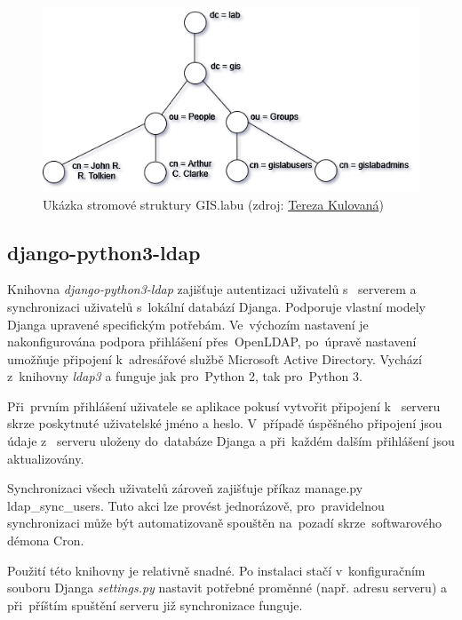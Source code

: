 \begin{figure}[H] \centering
      \includegraphics[width=400pt]{./pictures/gislab-ldap_dit.png}
      \caption[Ukázka stromové struktury GIS.labu]{Ukázka stromové struktury GIS.labu (zdroj:
	  \href{}{Tereza Kulovaná})}
      \label{fig:gislab-dit}
\end{figure}

\subsection{django-python3-ldap}
Knihovna \textit{django-python3-ldap} zajišťuje autentizaci uživatelů
s~ serverem a synchronizaci  uživatelů s~lokální
databází Djanga. Podporuje vlastní modely Djanga upravené specifickým
potřebám. Ve~výchozím nastavení je nakonfi\-gurována podpora přihlášení
přes~OpenLDAP, po~úpravě nastavení umožňuje připojení k~adresářové
službě Microsoft Active Directory. Vychází z~knihovny \textit{ldap3} a 
funguje jak pro~Python 2, tak pro~Python 3. \cite{django-python3}

Při~prvním přihlášení uživatele se aplikace pokusí vytvořit připojení
k~ serveru skrze poskytnuté uživatelské jméno a heslo. V~případě 
úspěšného připojení jsou údaje z~ serveru uloženy do~databáze 
Djanga a při~každém dalším přihlášení jsou aktualizovány.

Synchronizaci všech uživatelů zároveň zajišťuje příkaz
\textsf{manage.py ldap\_sync\_users}. Tuto akci lze provést
jednorázově, pro~pravidelnou synchronizaci může být automatizovaně
spouštěn na~pozadí skrze~softwarového démona Cron. \cite{django-python3}

Použití této knihovny je relativně snadné. Po instalaci stačí v~konfiguračním 
souboru Djanga \textit{settings.py} nastavit potřebné
proměnné (např.  adresu  serveru) a při~příštím
spuštění serveru již synchronizace funguje.

